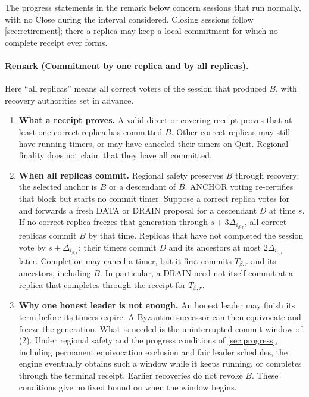 \documentclass[11pt,a4paper]{article}
\begin{document}
The progress statements in the remark below concern sessions that run
normally, with no Close during the interval considered. Closing
sessions follow \cref{sec:retirement}; there a replica may keep a local
commitment for which no complete receipt ever forms.

\paragraph{Remark (Commitment by one replica and by all replicas).}
Here ``all replicas'' means all correct voters of the session that
produced $B$, with recovery authorities set in advance.
\begin{enumerate}[label=(\arabic*),itemsep=4pt]
\item \textbf{What a receipt proves.} A valid direct or covering receipt
proves that at least one correct replica has committed $B$. Other correct
replicas may still have running timers, or may have canceled their timers
on Quit. Regional finality does not claim that they have all committed.

\item \textbf{When all replicas commit.} Regional safety preserves $B$
through recovery: the selected anchor is $B$ or a descendant of $B$.
ANCHOR voting re-certifies that block but starts no commit timer.
Suppose a correct replica votes for and forwards a fresh DATA or DRAIN
proposal for a descendant $D$ at time $s$. If no correct replica freezes
that generation through $s+3\Delta_{i_{\beta,r}}$, all correct replicas
commit $B$ by that time. Replicas that have not completed the session
vote by $s+\Delta_{i_{\beta,r}}$; their timers commit $D$ and its
ancestors at most $2\Delta_{i_{\beta,r}}$ later. Completion may cancel a
timer, but it first commits $T_{\beta,r}$ and its ancestors, including
$B$. In particular, a DRAIN need not itself commit at a replica that
completes through the receipt for $T_{\beta,r}$.

\item \textbf{Why one honest leader is not enough.} An honest leader may
finish its term before its timers expire. A Byzantine successor can then
equivocate and freeze the generation. What is needed is the uninterrupted
commit window of (2). Under regional safety and the progress conditions
of \cref{sec:progress}, including permanent equivocation exclusion and
fair leader schedules, the engine eventually obtains such a window while
it keeps running, or completes through the terminal receipt. Earlier
recoveries do not revoke $B$. These conditions give no fixed bound on
when the window begins.


\end{enumerate}
\end{document}
